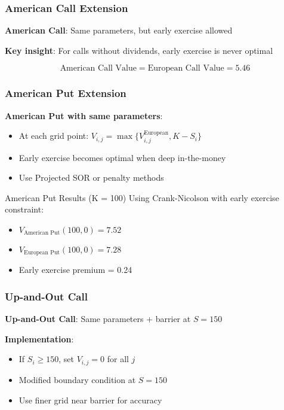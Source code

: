 \documentclass[aspectratio=169]{beamer}
\begin{document}
\begin{frame}
\frametitle{American Call Extension}
\textbf{American Call}: Same parameters, but early exercise allowed

\textbf{Key insight}: For calls without dividends, early exercise is never optimal

\[\text{American Call Value} = \text{European Call Value} = 5.46\]
\end{frame}

\begin{frame}
\frametitle{American Put Extension}
\textbf{American Put with same parameters}:
\begin{itemize}
\item At each grid point: \(V_{i,j} = \max\{V_{i,j}^{\text{European}}, K - S_i\}\)
\item Early exercise becomes optimal when deep in-the-money
\item Use Projected SOR or penalty methods
\end{itemize}

\begin{block}{American Put Results (K = 100)}
Using Crank-Nicolson with early exercise constraint:
\begin{itemize}
\item \(V_{\text{American Put}}(100, 0) = 7.52\)
\item \(V_{\text{European Put}}(100, 0) = 7.28\)
\item Early exercise premium = 0.24
\end{itemize}
\end{block}
\end{frame}

\begin{frame}
\frametitle{Up-and-Out Call}
\textbf{Up-and-Out Call}: Same parameters + barrier at \(S = 150\)

\textbf{Implementation}:
\begin{itemize}
\item If \(S_i \geq 150\), set \(V_{i,j} = 0\) for all \(j\)
\item Modified boundary condition at \(S = 150\)
\item Use finer grid near barrier for accuracy
\end{itemize}
\end{frame}
\end{document}
